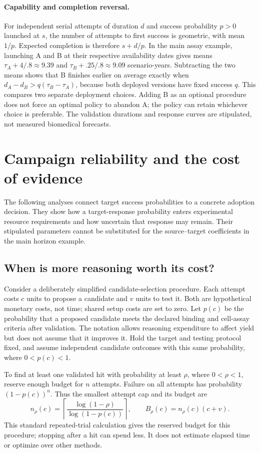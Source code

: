 \paragraph{Capability and completion reversal.}
For independent serial attempts of duration $d$ and success probability $p>0$ launched at $s$, the number of attempts to first success is geometric, with mean $1/p$. Expected completion is therefore $s+d/p$. In the main assay example, launching A and B at their respective availability dates gives means $\tau_A+4/.8\approx9.39$ and $\tau_B+.25/.8\approx9.09$ scenario-years. Subtracting the two means shows that B finishes earlier on average exactly when $d_A-d_B>q(\tau_B-\tau_A)$, because both deployed versions have fixed success $q$. This compares two separate deployment choices. Adding B as an optional procedure does not force an optimal policy to abandon A; the policy can retain whichever choice is preferable. The validation durations and response curves are stipulated, not measured biomedical forecasts.

\section{Campaign reliability and the cost of evidence}
\label{sec:yield}
The following analyses connect target success probabilities to a concrete adoption decision. They show how a target-response probability enters experimental resource requirements and how uncertain that response may remain. Their stipulated parameters cannot be substituted for the source--target coefficients in the main horizon example.

\subsection{When is more reasoning worth its cost?}
Consider a deliberately simplified candidate-selection procedure. Each attempt costs $c$ units to propose a candidate and $v$ units to test it. Both are hypothetical monetary costs, not time; shared setup costs are set to zero. Let $p(c)$ be the probability that a proposed candidate meets the declared binding and cell-assay criteria after validation. The notation allows reasoning expenditure to affect yield but does not assume that it improves it. Hold the target and testing protocol fixed, and assume independent candidate outcomes with this same probability, where $0<p(c)<1$.

To find at least one validated hit with probability at least $\rho$, where $0<\rho<1$, reserve enough budget for $n$ attempts. Failure on all attempts has probability $(1-p(c))^n$. Thus the smallest attempt cap and its budget are
\begin{equation}
 n_\rho(c)=\left\lceil\frac{\log(1-\rho)}{\log(1-p(c))}\right\rceil,
 \qquad B_\rho(c)=n_\rho(c)(c+v).
 \label{eq:yieldbudget}
\end{equation}
This standard repeated-trial calculation gives the reserved budget for this procedure; stopping after a hit can spend less. It does not estimate elapsed time or optimize over other methods.

